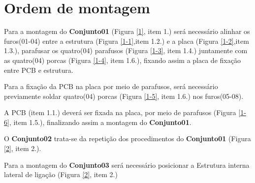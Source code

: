 \section{Ordem de montagem}

Para a montagem do \textbf{Conjunto01} (Figura \ref{1}, item 1.) será necessário alinhar os furos(01-04) entre a estrutura (Figura \ref{1-1},item 1.2.) e a placa (Figura \ref{1-2},item 1.3.), parafusar os quatro(04) parafusos (Figura \ref{1-3}, item 1.4.) juntamente com as quatro(04) porcas (Figura \ref{1-4}, item 1.6.), fixando assim a placa de fixação entre PCB e estrutura.

Para a fixação da PCB na placa por meio de parafusos, será necessário previamente soldar quatro(04) porcas (Figura \ref{1-5}, item 1.6.) nos furos(05-08).

A PCB (item 1.1.) deverá ser fixada na placa, por meio de parafusos (Figura \ref{1-6}, item 1.5.), finalizando assim a montagem do \textbf{Conjunto01}.

O \textbf{Conjunto02} trata-se da repetição dos procedimentos do \textbf{Conjunto01} (Figura \ref{2}, item 2.).

Para a montagem do \textbf{Conjunto03} será necessário posicionar a Estrutura interna lateral de ligação (Figura \ref{2}, item 2.)

\newpage


%


